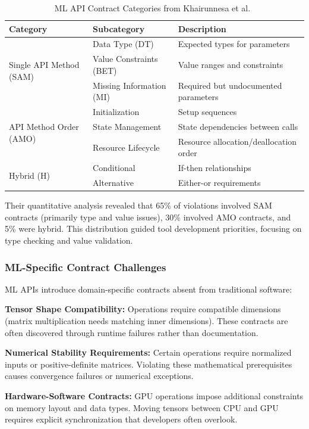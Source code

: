 \documentclass[11pt]{article}
\begin{document}
\begin{table}[h]
\centering
\caption{ML API Contract Categories from Khairunnesa et al.~\cite{khairunnesa2023}}
\label{tab:ml_contracts}
\begin{tabular}{llp{7cm}}
\toprule
\textbf{Category} & \textbf{Subcategory} & \textbf{Description} \\
\midrule
\multirow{3}{*}{Single API Method (SAM)} & Data Type (DT) & Expected types for parameters \\
 & Value Constraints (BET) & Value ranges and constraints \\
 & Missing Information (MI) & Required but undocumented parameters \\
\midrule
\multirow{3}{*}{API Method Order (AMO)} & Initialization & Setup sequences \\
 & State Management & State dependencies between calls \\
 & Resource Lifecycle & Resource allocation/deallocation order \\
\midrule
\multirow{2}{*}{Hybrid (H)} & Conditional & If-then relationships \\
 & Alternative & Either-or requirements \\
\bottomrule
\end{tabular}
\end{table}

Their quantitative analysis revealed that 65\% of violations involved SAM contracts (primarily type and value issues), 30\% involved AMO contracts, and 5\% were hybrid. This distribution guided tool development priorities, focusing on type checking and value validation.

\subsubsection{ML-Specific Contract Challenges}
ML APIs introduce domain-specific contracts absent from traditional software:

\textbf{Tensor Shape Compatibility:} Operations require compatible dimensions (matrix multiplication needs matching inner dimensions). These contracts are often discovered through runtime failures rather than documentation.

\textbf{Numerical Stability Requirements:} Certain operations require normalized inputs or positive-definite matrices. Violating these mathematical prerequisites causes convergence failures or numerical exceptions.

\textbf{Hardware-Software Contracts:} GPU operations impose additional constraints on memory layout and data types. Moving tensors between CPU and GPU requires explicit synchronization that developers often overlook.
\end{document}

